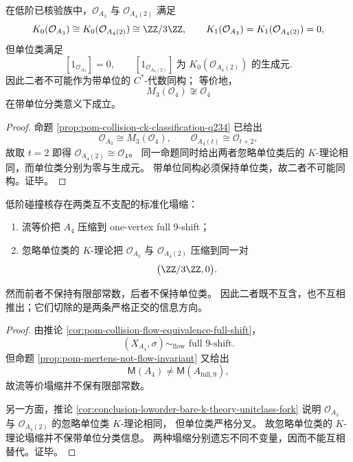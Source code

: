 \begin{corollary}\label{cor:conclusion-loworder-bare-k-theory-unitclass-fork}
在低阶已核验族中，\(\mathcal O_{A_3}\) 与 \(\mathcal O_{A_4(2)}\) 满足
\[
K_0(\mathcal O_{A_3})\cong K_0(\mathcal O_{A_4(2)})\cong \ZZ/3\ZZ,
\qquad
K_1(\mathcal O_{A_3})=K_1(\mathcal O_{A_4(2)})=0,
\]
但单位类满足
\[
[1_{\mathcal O_{A_3}}]=0,
\qquad
[1_{\mathcal O_{A_4(2)}}]\ \text{为 }K_0(\mathcal O_{A_4(2)})\text{ 的生成元}.
\]
因此二者不可能作为带单位的 \(C^\ast\)-代数同构；
等价地，
\[
M_3(\mathcal O_4)\not\cong \mathcal O_4
\]
在带单位分类意义下成立。
\end{corollary}
\begin{proof}
命题 \ref{prop:pom-collision-ck-classification-q234} 已给出
\[
\mathcal O_{A_3}\cong M_3(\mathcal O_4),
\qquad
\mathcal O_{A_4(t)}\cong \mathcal O_{t+2},
\]
故取 \(t=2\) 即得
\(
\mathcal O_{A_4(2)}\cong \mathcal O_4
\)。
同一命题同时给出两者忽略单位类后的 \(K\)-理论相同，而单位类分别为零与生成元。
带单位同构必须保持单位类，故二者不可能同构。证毕。
\end{proof}

\begin{proposition}[两类标准化塌缩的正交性]\label{prop:conclusion-two-standard-collapses-are-orthogonal}
低阶碰撞核存在两类互不支配的标准化塌缩：
\begin{enumerate}
  \item 流等价把 \(A_4\) 压缩到 one-vertex full \(9\)-shift；
  \item 忽略单位类的 \(K\)-理论把 \(\mathcal O_{A_3}\) 与 \(\mathcal O_{A_4(2)}\) 压缩到同一对
  \[
  \bigl(\ZZ/3\ZZ,0\bigr).
  \]
\end{enumerate}
然而前者不保持有限部常数，后者不保持单位类。
因此二者既不互含，也不互相推出；它们切除的是两条严格正交的信息方向。
\end{proposition}
\begin{proof}
由推论 \ref{cor:pom-collision-flow-equivalence-full-shift}，
\[
(X_{A_4},\sigma)\sim_{\mathrm{flow}}\text{ full }9\text{-shift}.
\]
但命题 \ref{prop:pom-mertens-not-flow-invariant} 又给出
\[
\mathsf M(A_4)\neq \mathsf M(A_{\mathrm{full},9}),
\]
故流等价塌缩并不保有限部常数。

另一方面，推论 \ref{cor:conclusion-loworder-bare-k-theory-unitclass-fork} 说明
\(\mathcal O_{A_3}\) 与 \(\mathcal O_{A_4(2)}\) 的忽略单位类 \(K\)-理论相同，
但单位类严格分叉。
故忽略单位类的 \(K\)-理论塌缩并不保带单位分类信息。
两种塌缩分别遗忘不同不变量，因而不能互相替代。证毕。
\end{proof}

